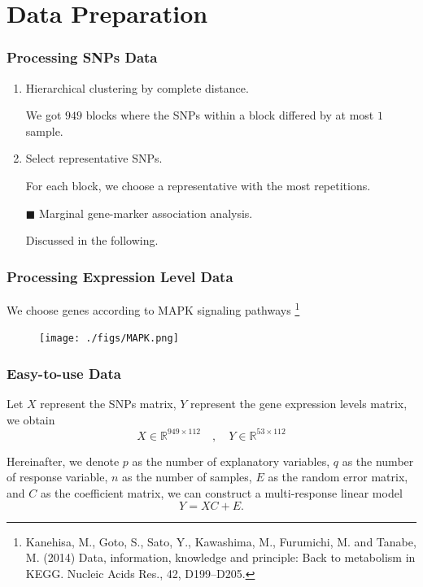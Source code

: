 \section{Data Preparation}
\begin{frame}
    \sectionpage
\end{frame}

\begin{frame}
    \frametitle{Processing SNPs Data}

    \begin{enumerate}
        \item Hierarchical clustering by complete distance.
        
        We got $949$ blocks where the SNPs within a block differed by at most $1$ sample. 

        \item Select representative SNPs. 
        
        For each block, we choose a representative with the most repetitions. 

        \item[$\blacksquare$] Marginal gene-marker association analysis. 
        
        Discussed in the following. 
    \end{enumerate}
\end{frame}

\begin{frame}
    \frametitle{Processing Expression Level Data}

    We choose genes according to MAPK signaling pathways \footnote[2]{Kanehisa, M., Goto, S., Sato, Y., Kawashima, M., Furumichi, M. and Tanabe, M. (2014) Data, information, knowledge and principle: Back to metabolism in KEGG. Nucleic Acids Res., 42, D199–D205.}

    \begin{figure}[h]
        \centering
        \texttt{[image: ./figs/MAPK.png]}
    \end{figure}
\end{frame}

\begin{frame}\frametitle{Easy-to-use Data}
    Let $X$ represent the SNPs matrix, $Y$ represent the gene expression levels matrix, we obtain
    \begin{equation*}
        X\in\mathbb{R}^{949\times112} \quad,\quad Y\in\mathbb{R}^{53\times112}
    \end{equation*}

    Hereinafter, we denote $p$ as the number of explanatory variables, $q$ as the number of response variable, $n$ as the number of samples, $E$ as the random error matrix, and $C$ as the coefficient matrix, we can construct a multi-response linear model
    \begin{equation*}
        Y = XC + E. 
    \end{equation*}
    
\end{frame}



